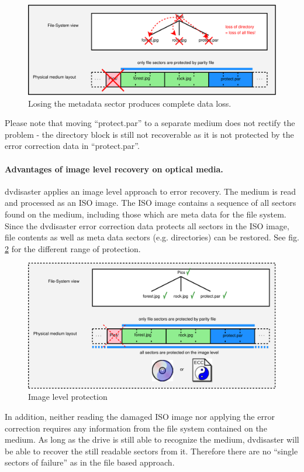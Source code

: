 {\begin{figure}[h]
\centerline{\includegraphics[width=\textwidth]{figures/metadata2.pdf}}
\caption{Losing the metadata sector produces complete data loss.}  
\label{qa-metadata2}
\end{figure}

Please note that moving ``protect.par'' to a separate medium does not rectify
the problem - the directory block is still not recoverable as it is not
protected by the error correction data in ``protect.par''.

\paragraph{Advantages of image level recovery on optical media.} dvdisaster applies
an image level approach to error recovery. The medium is read and processed as an ISO
image. The ISO image contains a sequence of all sectors found on the medium, including
those which are meta data for the file system. Since the dvdisaster error correction
data protects all sectors in the ISO image, file contents as well as meta data
sectors (e.g. directories) can be restored. See fig. \ref{qa-metadata3} for the
different range of protection. 

\begin{figure}[h]
\centerline{\includegraphics[width=\textwidth]{figures/metadata3.pdf}}
\caption{Image level protection}  
\label{qa-metadata3}
\end{figure}

In addition, neither reading the damaged ISO image nor applying the error
correction requires any information from the file system contained on the
medium. As long as the drive is still able to recognize the medium, dvdisaster
will be able to recover the still readable sectors from it. Therefore there are
no ``single sectors of failure'' as in the file based approach. }

